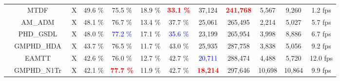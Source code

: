 \documentclass[journal]{IEEEtran}
\begin{document}
\begin{table*}[t]
\begin{tabular}{|c|c|c|ccccccccc|}
            & \footnotesize{MTDF~\cite{mtdf}} & \footnotesize{X}
            & \footnotesize{49.6 \%} &  \footnotesize{75.5 \%} &  \footnotesize{18.9 \%} &  \footnotesize{\textbf{\textcolor{red}{33.1 \%}}} &  \footnotesize{37,124} &  \footnotesize{\textbf{\textcolor{red}{241,768}}} &  \footnotesize{5,567} &  \footnotesize{9,260} &  \footnotesize{1.2 fps}   \\

            
            & \footnotesize{AM\_ADM~\cite{amadm}} & \footnotesize{X}
            & \footnotesize{48.1 \%} &  \footnotesize{76.7 \%} &  \footnotesize{13.4 \%} &  \footnotesize{37.7 \%} &  \footnotesize{25,061} &  \footnotesize{265,495} &  \footnotesize{2,214} &  \footnotesize{5,027} &  \footnotesize{5.7 fps}   \\
           
            &\footnotesize{PHD\_GSDL~\cite{fu1}} & \footnotesize{X}
            & \footnotesize{48.0 \%} &  \footnotesize{\textcolor{blue}{77.2 \%}} &  \footnotesize{17.1 \%} &  \footnotesize{\textcolor{blue}{35.6 \%}} &  \footnotesize{23,199} &  \footnotesize{265,954} &  \footnotesize{3,998} &  \footnotesize{8,886} &  \footnotesize{6.7 fps}   \\
            
            & \footnotesize{GMPHD\_HDA~\cite{prev1}} & \footnotesize{X}
            & \footnotesize{43.7 \%} &  \footnotesize{76.5 \%} &  \footnotesize{11.7 \%} &  \footnotesize{43.0 \%} &  \footnotesize{25,935} &  \footnotesize{287,758} &  \footnotesize{3,838} &  \footnotesize{5,056} &  \footnotesize{9.2 fps}   \\
            
            &\footnotesize{EAMTT~\cite{eamtt}} & \footnotesize{X}
            & \footnotesize{42.6 \%} &  \footnotesize{76.0 \%} &  \footnotesize{12.7 \%} &  \footnotesize{42.7 \%} &  \footnotesize{\textcolor{blue}{20,711}} &  \footnotesize{288,474} &  \footnotesize{4,488} &  \footnotesize{5,720} &  \footnotesize{12.0 fps}   \\
            
            & \footnotesize{GMPHD\_N1Tr~\cite{gmphdn1tr}} & \footnotesize{X}
            & \footnotesize{42.1 \%} &  \footnotesize{\textbf{\textcolor{red}{77.7 \%}}} &  \footnotesize{11.9 \%} &  \footnotesize{42.7 \%} &  \footnotesize{\textbf{\textcolor{red}{18,214}}} &  \footnotesize{297,646} &  \footnotesize{10,698} &  \footnotesize{10,864} &  \footnotesize{9.9 fps}   \\
            

\end{tabular}
\end{table*}
\end{document}
